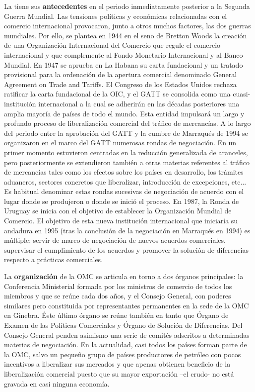 \documentclass{nuevotema}
\begin{document}
La  tiene sus \textbf{antecedentes} en el periodo inmediatamente posterior a la Segunda Guerra Mundial. Las tensiones políticas y económicas relacionadas con el comercio internacional provocaron, junto a otros muchos factores, las dos guerras mundiales. Por ello, se plantea en 1944 en el seno de Bretton Woods la creación de una Organización Internacional del Comercio que regule el comercio internacional y que complemente al Fondo Monetario Internacional y al Banco Mundial. En 1947 se aprueba en La Habana su carta fundacional y un tratado provisional para la ordenación de la apertura comercial denominado General Agreement on Trade and Tariffs. El Congreso de los Estados Unidos rechaza ratificar la carta fundacional de la OIC, y el GATT se consolida como una cuasi-institución internacional a la cual se adherirán en las décadas posteriores una amplia mayoría de países de todo el mundo. Esta entidad impulsará un largo y profundo proceso de liberalización comercial del tráfico de mercancías. A lo largo del periodo entre la aprobación del GATT y la cumbre de Marraqués de 1994 se organizaron en el marco del GATT numerosas rondas de negociación. En un primer momento estuvieron centradas en la reducción generalizada de aranceles, pero posteriormente se extendieron también a otras materias referentes al tráfico de mercancías tales como los efectos sobre los países en desarrollo, los trámites aduaneros, sectores concretos que liberalizar, introducción de excepciones, etc... Es habitual denominar estas rondas sucesivas de negociación de acuerdo con el lugar donde se produjeron o donde se inició el proceso. En 1987, la Ronda de Uruguay se inicia con el objetivo de establecer la Organización Mundial de Comercio. El objetivo de esta nueva institución internacional que iniciaría su andadura en 1995 (tras la conclusión de la negociación en Marraqués en 1994) es múltiple: servir de marco de negociación de nuevos acuerdos comerciales, supervisar el cumplimiento de los acuerdos y promover la solución de diferencias respecto a prácticas comerciales. 
 
La \textbf{organización} de la OMC se articula en torno a dos órganos principales: la Conferencia Ministerial formada por los ministros de comercio de todos los miembros y que se reúne cada dos años, y el Consejo General, con poderes similares pero constituida por representantes permanentes en la sede de la OMC en Ginebra. Éste último órgano se reúne también en tanto que Órgano de Examen de las Políticas Comerciales y Órgano de Solución de Diferencias. Del Consejo General penden asimismo una serie de comités adscritos a determinadas materias de negociación. En la actualidad, casi todos los países forman parte de la OMC, salvo un pequeño grupo de países productores de petróleo con pocos incentivos a liberalizar sus mercados y que apenas obtienen beneficio de la liberalización comercial puesto que su mayor exportación --el crudo- no está gravada en casi ninguna economía. 
\end{document}
